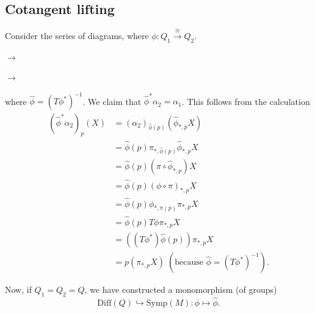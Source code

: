 \subsection{Cotangent lifting}
Consider the series of diagrams, where $\phi :Q_1\overset{\cong}{\rightarrow}Q_2$.
\begin{center}
    $\to$
    $\to$
\end{center}
where $\hat{\phi}=(T\phi^*)^{-1}$. We claim that $\hat{\phi}^*\alpha_2=\alpha_1$. This follows from the calculation 
\begin{equation}
    \begin{split}
        (\hat{\phi}^*\alpha_2)_p(X)&=(\alpha_2)_{\hat{\phi}(p)}(\hat{\phi}_{*,p}X)\\
        &=\hat{\phi}(p)\pi_{*,\hat{\phi}(p)}\hat{\phi}_{*,p}X\\
        &=\hat{\phi}(p)(\pi\circ\hat{\phi}_{*,p})X\\
        &=\hat{\phi}(p)(\phi\circ\pi)_{*,p}X\\
        &=\hat{\phi}(p)\phi_{*,\pi(p)}\pi_{*,p}X\\
        &=\hat{\phi}(p)T\phi \pi_{*,p}X\\
        &=((T\phi^*)\hat{\phi}(p))\pi_{*,p}X\\
        &=p(\pi_{*,p}X)\;(\text{because }\hat{\phi}=(T\phi^*)^{-1}).
    \end{split}
\end{equation}

Now, if $Q_1=Q_2=Q$, we have constructed a monomorphism (of groups)  
\begin{equation}
    \text{Diff}(Q)\hookrightarrow \text{Symp}(M):\phi\mapsto \hat{\phi}.
\end{equation}

